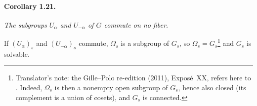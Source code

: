 \paragraph{\textbf{Corollary 1.21.}}
\emph{The subgroups \(U_\alpha\) and \(U_{-\alpha}\) of \(G\)
commute on no fiber.}

If \((U_\alpha)_s\) and \((U_{-\alpha})_s\) commute,
\(\Omega_s\) is a subgroup of \(G_s\), so \(\Omega_s=G_s\)\footnote{Translator's note: the Gille--Polo re-edition (2011), Exposé~XX, refers here
to . Indeed, \(\Omega_s\) is then a nonempty open subgroup of \(G_s\),
hence also closed (its complement is a union of cosets), and \(G_s\) is connected.} and \(G_s\) is
solvable.
